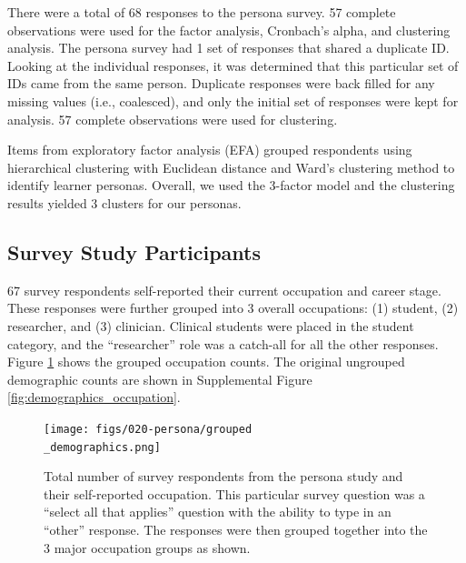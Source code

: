 \documentclass[020-persona\_validation.tex]{subfiles}
\begin{document}
    There were a total of 68 responses to the persona survey.
    57 complete observations %
    were used for the factor analysis, Cronbach's alpha, and clustering analysis.
    The persona survey had 1 set of responses %
    that shared a duplicate ID.
    Looking at the individual responses,
    it was determined that this particular set of IDs came from the same person.
    Duplicate responses were back filled for any missing values (i.e., coalesced),
    and only the initial set of responses were kept for analysis.
    57 complete observations %
    were used for clustering.

    Items from exploratory factor analysis (EFA) grouped respondents
    using hierarchical clustering with Euclidean distance and Ward's clustering method
    to identify learner personas.
    Overall,
    we used the 3-factor model and the clustering results yielded 3 clusters for our personas.

    \subsection{Survey Study Participants}

        67 survey respondents self-reported their current occupation and career stage.
        These responses were further grouped into 3 overall occupations:
        (1) student,
        (2) researcher, and
        (3) clinician.
        Clinical students were placed in the student category,
        and the ``researcher'' role was a catch-all for all the other responses.
        Figure \ref{fig:groupeddemographics} shows the grouped occupation counts.
        The original ungrouped demographic counts are shown in Supplemental Figure \ref{fig:demographics_occupation}.

        \begin{figure}[!hbtp]
            \centering
            \texttt{[image: figs/020-persona/grouped\\\_demographics.png]}
            \caption[Grouped demographics for persona survey respondents]{
            Total number of survey respondents from the persona study and their self-reported occupation.
                This particular survey question was a ``select all that applies''
                question with the ability to type in an ``other'' response.
                The responses were then grouped together into the 3 major occupation groups as shown.}
            \label{fig:groupeddemographics}
        \end{figure}
\end{document}
